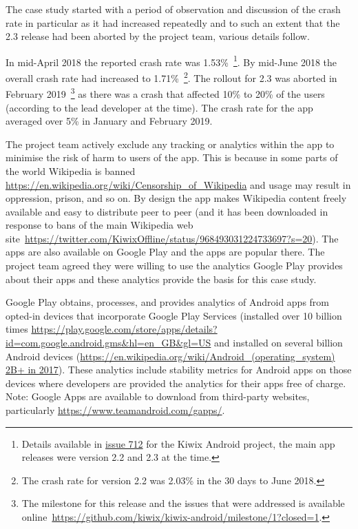 The case study started with a period of observation and discussion of the crash rate in particular as it had increased repeatedly and to such an extent that the 2.3 release had been aborted by the project team, various details follow.

In mid-April 2018 the reported crash rate was 1.53\%~\footnote{Details available in \href{https://github.com/kiwix/kiwix-android/issues/712}{issue 712} for the Kiwix Android project, the main app releases were version 2.2 and 2.3 at the time.}. By mid-June 2018 the overall crash rate had increased to 1.71\%~\footnote{The crash rate for version 2.2 was 2.03\% in the 30 days to  June 2018.}. The rollout for 2.3 was aborted in February 2019~\footnote{The milestone for this release and the issues that were addressed is available online~\url{https://github.com/kiwix/kiwix-android/milestone/1?closed=1}.} as there was a crash that affected 10\% to 20\% of the users (according to the lead developer at the time). The crash rate for the app averaged over 5\% in January and February 2019. 



The project team actively exclude any tracking or analytics within the app to minimise the risk of harm to users of the app. This is because in some parts of the world Wikipedia is banned \url{https://en.wikipedia.org/wiki/Censorship\_of\_Wikipedia} and usage may result in oppression, prison, and so on. By design the app makes Wikipedia content freely available and easy to distribute peer to peer (and it has been downloaded in response to bans of the main Wikipedia web site~\url{https://twitter.com/KiwixOffline/status/968493031224733697?s=20}). The apps are also available on Google Play and the apps are popular there. The project team agreed they were willing to use the analytics Google Play provides about their apps and these analytics provide the basis for this case study.

Google Play obtains, processes, and provides analytics of Android apps from opted-in devices that incorporate Google Play Services (installed over 10 billion times \url{https://play.google.com/store/apps/details?id=com.google.android.gms&hl=en\_GB&gl=US} and installed on several billion Android devices (\url{https://en.wikipedia.org/wiki/Android_(operating_system) 2B+ in 2017}). These analytics include stability metrics for Android apps on those devices where developers are provided the analytics for their apps free of charge.
Note: Google Apps are available to download from third-party websites, particularly \url{https://www.teamandroid.com/gapps/}. 


